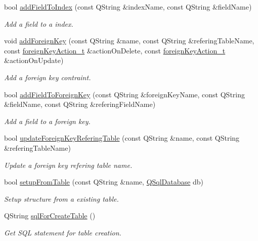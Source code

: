 \begin{DoxyCompactItemize}
bool \hyperlink{classmdt_sql_schema_table_a3deb6f2b10178c252afbaabefb687722}{add\-Field\-To\-Index} (const Q\-String \&index\-Name, const Q\-String \&field\-Name)
\begin{DoxyCompactList}\small\item\em Add a field to a index. \end{DoxyCompactList}\item 
void \hyperlink{classmdt_sql_schema_table_a48ab41fda7864ec8cd59468de2475ff2}{add\-Foreign\-Key} (const Q\-String \&name, const Q\-String \&refering\-Table\-Name, const \hyperlink{classmdt_sql_schema_table_a1738e443f03dc69b914edb967cb911be}{foreign\-Key\-Action\-\_\-t} \&action\-On\-Delete, const \hyperlink{classmdt_sql_schema_table_a1738e443f03dc69b914edb967cb911be}{foreign\-Key\-Action\-\_\-t} \&action\-On\-Update)
\begin{DoxyCompactList}\small\item\em Add a foreign key contraint. \end{DoxyCompactList}\item 
bool \hyperlink{classmdt_sql_schema_table_a0909cc0e3ad602312ddf44de397d9fe4}{add\-Field\-To\-Foreign\-Key} (const Q\-String \&foreign\-Key\-Name, const Q\-String \&field\-Name, const Q\-String \&refering\-Field\-Name)
\begin{DoxyCompactList}\small\item\em Add a field to a foreign key. \end{DoxyCompactList}\item 
bool \hyperlink{classmdt_sql_schema_table_a652c5afd4af2965e8d5ead724dda3230}{update\-Foreign\-Key\-Refering\-Table} (const Q\-String \&name, const Q\-String \&refering\-Table\-Name)
\begin{DoxyCompactList}\small\item\em Update a foreign key refering table name. \end{DoxyCompactList}\item 
bool \hyperlink{classmdt_sql_schema_table_a2cea444ccb26b0802fb230db5460e167}{setup\-From\-Table} (const Q\-String \&name, \hyperlink{class_q_sql_database}{Q\-Sql\-Database} db)
\begin{DoxyCompactList}\small\item\em Setup structure from a existing table. \end{DoxyCompactList}\item 
Q\-String \hyperlink{classmdt_sql_schema_table_af6c605b7e7860ced2512792efda76357}{sql\-For\-Create\-Table} ()
\begin{DoxyCompactList}\small\item\em Get S\-Q\-L statement for table creation. \end{DoxyCompactList}\item 

\end{DoxyCompactItemize}
